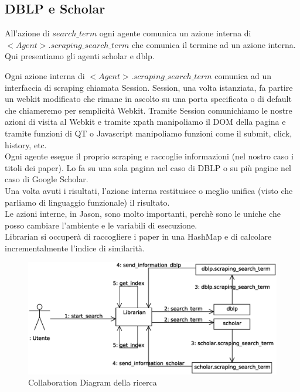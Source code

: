 \documentclass[12pt]{article}
\begin{document}
\subsection{DBLP e Scholar}
All'azione di $search\_term$ ogni agente comunica un azione interna di $<Agent>.scraping\_search\_term$ che comunica il termine ad un azione interna. Qui presentiamo gli agenti scholar e dblp.




Ogni azione interna di $<Agent>.scraping\_search\_term$ comunica ad un interfaccia di scraping chiamata Session. Session, una volta istanziata, fa partire un webkit modificato che rimane in ascolto su una porta specificata o di default che chiameremo per semplicit\`a Webkit. Tramite Session comunichiamo le nostre azioni di visita al Webkit e tramite xpath manipoliamo il DOM della pagina e tramite funzioni di QT o Javascript manipoliamo funzioni come il submit, click, history, etc. \\
Ogni agente esegue il proprio scraping e raccoglie informazioni (nel nostro caso i titoli dei paper). Lo fa su una sola pagina nel caso di DBLP o su pi\`u pagine nel caso di Google Scholar.\\
Una volta avuti i risultati, l'azione interna restituisce o meglio unifica (visto che parliamo di linguaggio funzionale) il risultato. \\
Le azioni interne, in Jason, sono molto importanti, perch\`e sono le uniche che posso cambiare l'ambiente e le variabili di esecuzione. \\ 
Librarian si occuper\`a di raccogliere i paper in una HashMap e di calcolare incrementalmente l'indice di similarit\`a. 

\begin{figure}[htbp]
\centering
\includegraphics[width=\textwidth]{search_terms.eps}
\caption{Collaboration Diagram della ricerca}
\end{figure}
\end{document}
